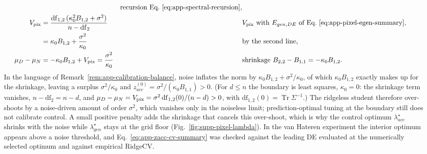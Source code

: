 \begin{remark}
\begin{enumerate}
\begin{align*}
&&\text{recursion Eq.~\ref{eq:app-spectral-recursion},}\\
V_{\rm pix}&=\frac{\mathrm{df}_{1,2}\,(\kappa_0^2B_{1,2}+\sigma^2)}{n-\mathrm{df}_2}
&&\text{$V_{\rm pix}$ with $E_{gen,DE}$ of Eq.~\ref{eq:app-pixel-egen-summary},}\\
&=\kappa_0B_{1,2}+\frac{\sigma^2}{\kappa_0}
&&\text{by the second line,}\\
\mu_D-\mu_N&=-\kappa_0B_{1,2}+V_{\rm pix}=\frac{\sigma^2}{\kappa_0}
&&\text{shrinkage $B_{2,2}-B_{1,1}=-\kappa_0B_{1,2}$.}
\end{align*}
In the language of Remark~\ref{rem:app-calibration-balance}, noise inflates
the norm by $\kappa_0B_{1,2}+\sigma^2/\kappa_0$, of which $\kappa_0B_{1,2}$
exactly makes up for the shrinkage, leaving a surplus $\sigma^2/\kappa_0$ and
$z^{(0)}_{acc}=\sigma^2/(\kappa_0B_{1,1})>0$.
(For $d\le n$ the boundary is least squares, $\kappa_0=0$: the shrinkage term
vanishes, $n-\mathrm{df}_2=n-d$, and
$\mu_D-\mu_N=V_{\rm pix}=\sigma^2\,\mathrm{df}_{1,2}(0)/(n-d)>0$, with
$\mathrm{df}_{1,2}(0)=\operatorname{Tr}\Sigma^{-1}$.)  The ridgeless student
therefore over-shoots by a noise-driven amount of order $\sigma^2$, which
vanishes only in the noiseless limit; prediction-optimal tuning at the
boundary still does not calibrate control.  A small positive penalty adds
the shrinkage that cancels this over-shoot, which is why the control optimum
$\lambda^\star_{acc}$ shrinks with the noise while $\lambda^\star_{gen}$ stays
at the grid floor (Fig.~\ref{fig:supp-pixel-lambda}).  In the van Hateren
experiment the interior optimum appears above a noise threshold, and
Eq.~\ref{eq:app-zacc-cv-summary} was checked against the leading DE
evaluated at the numerically selected optimum and against empirical RidgeCV.

\end{enumerate}
\end{remark}
